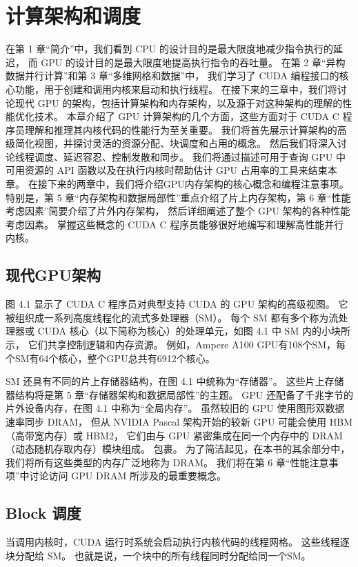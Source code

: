 \section{计算架构和调度}
在第 1 章“简介”中，我们看到 CPU 的设计目的是最大限度地减少指令执行的延迟，
而 GPU 的设计目的是最大限度地提高执行指令的吞吐量。 在第 2 章“异构数据并行计算”和第 3 章“多维网格和数据”中，
我们学习了 CUDA 编程接口的核心功能，用于创建和调用内核来启动和执行线程。 
在接下来的三章中，我们将讨论现代 GPU 的架构，包括计算架构和内存架构，以及源于对这种架构的理解的性能优化技术。 
本章介绍了 GPU 计算架构的几个方面，这些方面对于 CUDA C 程序员理解和推理其内核代码的性能行为至关重要。 
我们将首先展示计算架构的高级简化视图，并探讨灵活的资源分配、块调度和占用的概念。 
然后我们将深入讨论线程调度、延迟容忍、控制发散和同步。 
我们将通过描述可用于查询 GPU 中可用资源的 API 函数以及在执行内核时帮助估计 GPU 占用率的工具来结束本章。 
在接下来的两章中，我们将介绍GPU内存架构的核心概念和编程注意事项。 
特别是，第 5 章“内存架构和数据局部性”重点介绍了片上内存架构，第 6 章“性能考虑因素”简要介绍了片外内存架构，
然后详细阐述了整个 GPU 架构的各种性能考虑因素。 掌握这些概念的 CUDA C 程序员能够很好地编写和理解高性能并行内核。

\subsection{现代GPU架构}
图 4.1 显示了 CUDA C 程序员对典型支持 CUDA 的 GPU 架构的高级视图。 它被组织成一系列高度线程化的流式多处理器（SM）。 
每个 SM 都有多个称为流处理器或 CUDA 核心（以下简称为核心）的处理单元，如图 4.1 中 SM 内的小块所示，
它们共享控制逻辑和内存资源。 例如，Ampere A100 GPU有108个SM，每个SM有64个核心，整个GPU总共有6912个核心。

SM 还具有不同的片上存储器结构，在图 4.1 中统称为“存储器”。 这些片上存储器结构将是第 5 章“存储器架构和数据局部性”的主题。 
GPU 还配备了千兆字节的片外设备内存，在图 4.1 中称为“全局内存”。 虽然较旧的 GPU 使用图形双数据速率同步 DRAM，
但从 NVIDIA Pascal 架构开始的较新 GPU 可能会使用 HBM（高带宽内存）或 HBM2，
它们由与 GPU 紧密集成在同一个内存中的 DRAM（动态随机存取内存）模块组成。 包裹。 为了简洁起见，在本书的其余部分中，
我们将所有这些类型的内存广泛地称为 DRAM。 我们将在第 6 章“性能注意事项”中讨论访问 GPU DRAM 所涉及的最重要概念。

\subsection{Block 调度}
当调用内核时，CUDA 运行时系统会启动执行内核代码的线程网格。 这些线程逐块分配给 SM。 
也就是说，一个块中的所有线程同时分配给同一个SM。

